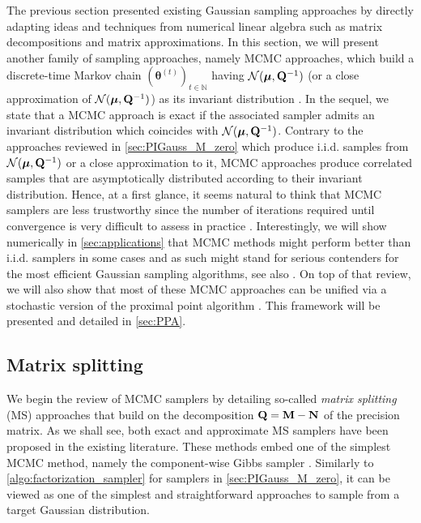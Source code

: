 \documentclass[nohypdvips,onefignum,onetabnum]{siamart171218}
\begin{document}
The previous section presented existing Gaussian sampling approaches by directly adapting ideas and techniques from numerical linear algebra such as matrix decompositions and matrix approximations. 
In this section, we will present another family of sampling approaches, namely MCMC approaches, which build a discrete-time Markov chain $(\boldsymbol{\theta}^{(t)})_{t \in \mathbb{N}}$ having $\mathcal{N}(\boldsymbol{\mu},\mathbf{Q}^{-1})$ (or a close approximation of $\mathcal{N}(\boldsymbol{\mu},\mathbf{Q}^{-1})$) as its invariant distribution \cite{Robert2004}.
In the sequel, we state that a MCMC approach is exact if the associated sampler admits an invariant distribution which  coincides with $\mathcal{N}(\boldsymbol{\mu},\mathbf{Q}^{-1})$.
Contrary to the approaches reviewed in \cref{sec:PIGauss_M_zero} which produce i.i.d. samples from $\mathcal{N}(\boldsymbol{\mu},\mathbf{Q}^{-1})$ or a close approximation to it, MCMC approaches produce correlated samples that are asymptotically distributed according to their invariant distribution.
Hence, at a first glance, it seems natural to think that MCMC samplers are less trustworthy since the number of iterations required until convergence is very difficult to assess in practice \cite{HobertJones2001}.
Interestingly, we will show numerically in \cref{sec:applications} that MCMC methods might perform better than i.i.d. samplers in some cases and as such might stand for serious contenders for the most efficient Gaussian sampling algorithms, see also \cite{Fox2017}.
On top of that review, we will also show that most of these MCMC approaches can be unified via a stochastic version of the proximal point algorithm \cite{Rockafellar1976}. 
This framework will be presented and detailed in \cref{sec:PPA}.

\subsection{Matrix splitting}
\label{subsec:matrix_split}

We begin the review of MCMC samplers by detailing so-called \textit{matrix splitting} (MS) approaches that build on the decomposition $\mathbf{Q} = \mathbf{M} - \mathbf{N}$ of the precision matrix.
As we shall see, both exact and approximate MS samplers have been proposed in the existing literature.
These methods embed one of the simplest MCMC method, namely the component-wise Gibbs sampler \cite{Geman1984}.
Similarly to \cref{algo:factorization_sampler} for samplers in \cref{sec:PIGauss_M_zero}, it can be viewed as one of the simplest and straightforward approaches to sample from a target Gaussian distribution.
\end{document}
